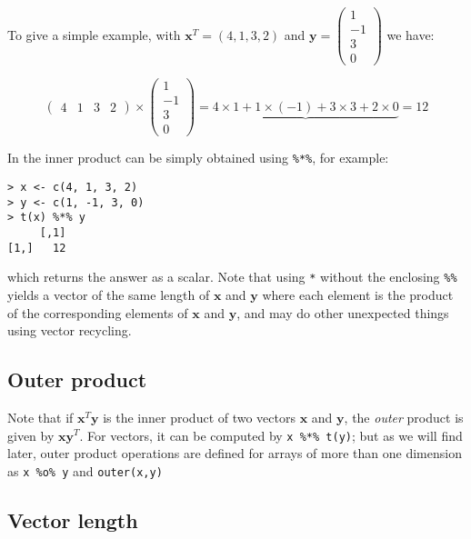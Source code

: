 To give a simple example, with $\boldsymbol{x}^{T} = (4,1,3,2)$ and $\boldsymbol{y} = \left( \begin{array}{r} 1 \\ -1 \\ 3 \\ 0 \end{array} \right)$ we have:

\begin{displaymath}
\left(
\begin{array}{rrrr}
4 & 1 & 3 & 2
\end{array}
\right) \times
\left(
\begin{array}{r}
1\\
-1\\
3\\
0
\end{array}
\right)
=
\underbrace{4 \times 1 + 1 \times (-1) + 3 \times 3 + 2 \times 0} = 12
\end{displaymath}

In \R the inner product can be simply obtained using \verb+%*%+, for example:
\singlespacing
\begin{verbatim}
> x <- c(4, 1, 3, 2)
> y <- c(1, -1, 3, 0)
> t(x) %*% y
     [,1]
[1,]   12
\end{verbatim}
\onehalfspacing
which returns the answer as a scalar.   Note that using \verb+*+ without the enclosing \verb+%%+ yields a vector of the same length of $\boldsymbol{x}$ and $\boldsymbol{y}$ where each element is the product of the corresponding elements of $\boldsymbol{x}$ and $\boldsymbol{y}$, and may do other unexpected things using vector recycling.

\subsection{Outer product}

Note that if $\boldsymbol{x}^{T}\boldsymbol{y}$ is the inner product of two vectors $\boldsymbol{x}$ and $\boldsymbol{y}$, the \emph{outer} product is given by  $\boldsymbol{x}\boldsymbol{y}^{T}$.   For vectors, it can be computed by \verb+x %*% t(y)+; but as we will find later, outer product operations are defined for arrays of more than one dimension as \verb+x %o% y+ and \verb+outer(x,y)+ 

\subsection{Vector length}
\label{vectorlength}

